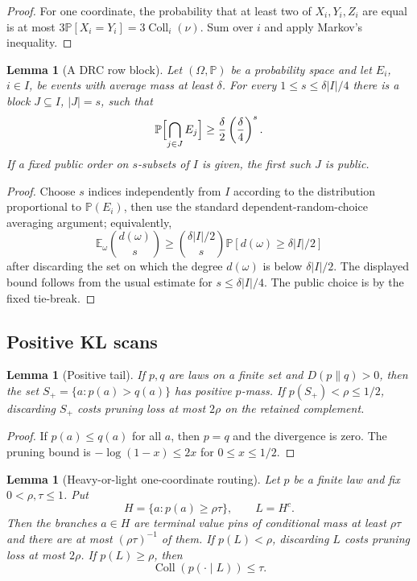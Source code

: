 \documentclass[11pt]{article}
\newtheorem{lemma}[theorem]{Lemma}
\theoremstyle{remark}
\newcommand{\E}{\mathbb E}
\newcommand{\Prob}{\mathbb P}
\newcommand{\Coll}{\operatorname{Coll}}
\begin{document}
\begin{proof}
For one coordinate, the probability that at least two of $X_i,Y_i,Z_i$ are equal is at most $3\Prob[X_i=Y_i]=3\Coll_i(\nu)$.  Sum over $i$ and apply Markov's inequality.
\end{proof}

\begin{lemma}[A DRC row block]\label{lem:drc}
Let $(\Omega,\Prob)$ be a probability space and let $E_i$, $i\in I$, be events with average mass at least $\delta$.  For every $1\le s\le \delta |I|/4$ there is a block $J\subseteq I$, $|J|=s$, such that
\[
        \Prob\Bigl[\bigcap_{j\in J}E_j\Bigr]\ge \frac{\delta}{2}\left(\frac{\delta}{4}\right)^s.
\]
If a fixed public order on $s$-subsets of $I$ is given, the first such $J$ is public.
\end{lemma}

\begin{proof}
Choose $s$ indices independently from $I$ according to the distribution proportional to $\Prob(E_i)$, then use the standard dependent-random-choice averaging argument; equivalently,
\[
        \E_{\omega}\binom{d(\omega)}{s}\ge \binom{\delta |I|/2}{s}\Prob[d(\omega)\ge \delta |I|/2]
\]
after discarding the set on which the degree $d(\omega)$ is below $\delta |I|/2$.  The displayed bound follows from the usual estimate for $s\le \delta |I|/4$.  The public choice is by the fixed tie-break.
\end{proof}

\subsection{Positive KL scans}

\begin{lemma}[Positive tail]\label{lem:positive-tail}
If $p,q$ are laws on a finite set and $D(p\|q)>0$, then the set $S_+=\{a:p(a)>q(a)\}$ has positive $p$-mass.  If $p(S_+)<\rho\le1/2$, discarding $S_+$ costs pruning loss at most $2\rho$ on the retained complement.
\end{lemma}

\begin{proof}
If $p(a)\le q(a)$ for all $a$, then $p=q$ and the divergence is zero.  The pruning bound is $-\log(1-x)\le 2x$ for $0\le x\le1/2$.
\end{proof}

\begin{lemma}[Heavy-or-light one-coordinate routing]\label{lem:heavy-light}
Let $p$ be a finite law and fix $0<\rho,\tau\le1$.  Put
\[
        H=\{a:p(a)\ge \rho\tau\},\qquad L=H^c.
\]
Then the branches $a\in H$ are terminal value pins of conditional mass at least $\rho\tau$ and there are at most $(\rho\tau)^{-1}$ of them.  If $p(L)<\rho$, discarding $L$ costs pruning loss at most $2\rho$.  If $p(L)\ge\rho$, then
\[
        \Coll(p(\cdot\mid L))\le \tau.
\]
\end{lemma}
\end{document}

